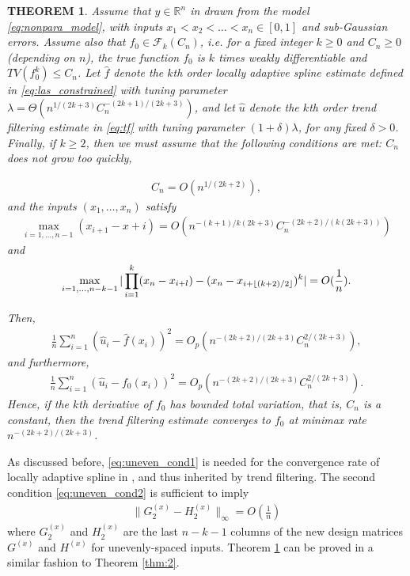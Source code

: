 \documentclass[a4paper]{article}
\DeclarePairedDelimiter\floor{\lfloor}{\rfloor}
\newtheorem{theorem}{THEOREM}
\newcommand{\RR}{\mathbb{R}}
\renewcommand{\cal}{\mathcal}
\begin{document}
\begin{theorem}
Assume that $y\in\RR^n$ in drawn from the model \eqref{eq:nonpara_model}, with inputs $x_1<x_2<\ldots<x_n\in[0,1]$ and sub-Gaussian errors. Assume also that $f_0\in\cal{F}_k(C_n)$, i.e. for a fixed integer $k\geq 0$ and $C_n\geq 0$ (depending on $n$), the true function $f_0$ is $k$ times weakly differentiable and $TV(f_0^{k})\leq C_n$. Let $\hat{f}$ denote the $k$th order locally adaptive spline estimate defined in \eqref{eq:las_constrained} with tuning parameter $\lambda = \Theta(n^{1/(2k+3)}C_n^{-(2k+1)/(2k+3)})$, and let $\hat{u}$ denote the $k$th order trend filtering estimate in \eqref{eq:tf} with tuning parameter $(1+\delta)\lambda$, for any fixed $\delta >0$. Finally, if $k\geq 2$, then we must assume that the following conditions are met: $C_n$ does not grow too quickly,

\begin{align*}
C_n = O(n^{1/(2k+2)}),
\end{align*}
and the inputs $(x_1,\ldots, x_n)$ satisfy
\begin{align}
\max_{i=1,\ldots, n-1} (x_{i+1}-x+i) = O(n^{-(k+1)/k(2k+3)}C_n^{-(2k+2)/(k(2k+3))})
\label{eq:uneven_cond1}
\end{align}
and
\begin{align}
\max_{i=1,\ldots,n-k-1} |\prod_{i=1}^k(x_n-x_{i+l}) - (x_n-x_{i+\floor{(k+2)/2}})^k| = O(\frac{1}{n}).
\label{eq:uneven_cond2}
\end{align}

Then, 
\begin{align*}
\frac{1}{n}\sum_{i=1}^n (\hat{u}_i - \hat{f}(x_i))^2 = O_p(n^{-(2k+2)/(2k+3)}C_n^{2/(2k+3)}),
\end{align*}
and furthermore,
\begin{align*}
\frac{1}{n}\sum_{i=1}^n (\hat{u}_i-f_0(x_i))^2 = O_p(n^{-(2k+2)/(2k+3)}C_n^{2/(2k+3)}).
\end{align*}
Hence, if the $k$th derivative of $f_0$ has bounded total variation, that is, $C_n$ is a constant, then the trend filtering estimate converges to $f_0$ at minimax rate $n^{-(2k+2)/(2k+3)}$.
\label{thm:3}
\end{theorem}

As discussed before, \eqref{eq:uneven_cond1} is needed for the convergence rate of locally adaptive spline in \cite{mammen1997locally}, and thus inherited by trend filtering. The second condition \eqref{eq:uneven_cond2} is sufficient to imply
\begin{align*}
\|G_2^{(x)} - H_2^{(x)}\|_\infty = O(\frac{1}{n})
\end{align*}
where $G_2^{(x)}$ and $H_2^{(x)}$ are the last $n-k-1$ columns of the new design matrices $G^{(x)}$ and $H^{(x)}$ for unevenly-spaced inputs. Theorem \ref{thm:3} can be proved in a similar fashion to Theorem \ref{thm:2}.
\end{document}
